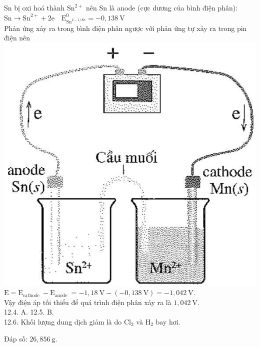 \documentclass[10pt]{article}
\begin{document}
Sn bị oxi hoá thành $\mathrm{Sn}^{2+}$ nên Sn là anode (cực dương của bình điện phân):\\
$\mathrm{Sn} \rightarrow \mathrm{Sn}^{2+}+2 \mathrm{e} \quad \mathrm{E}_{\mathrm{Sn}^{2-1 / S n}}^{0}=-0,138 \mathrm{~V}$\\
Phản ứng xảy ra trong bình điện phân ngược với phản ứng tự xảy ra trong pin điện nên\\
\includegraphics[max width=\textwidth, center]{2025_10_23_3f52bbaab6caa9e2ff75g-11}\\
$\mathrm{E}=\mathrm{E}_{\text {cathode }}-\mathrm{E}_{\text {anode }}=-1,18 \mathrm{~V}-(-0,138 \mathrm{~V})=-1,042 \mathrm{~V}$.\\
Vậy điện áp tối thiểu để quá trình điện phân xảy ra là $1,042 \mathrm{~V}$.\\
12.4. A. 12.5. B.\\
12.6. Khối lượng dung dịch giảm là do $\mathrm{Cl}_{2}$ và $\mathrm{H}_{2}$ bay hơi.

Đáp số: $26,856 \mathrm{~g}$.
\end{document}
